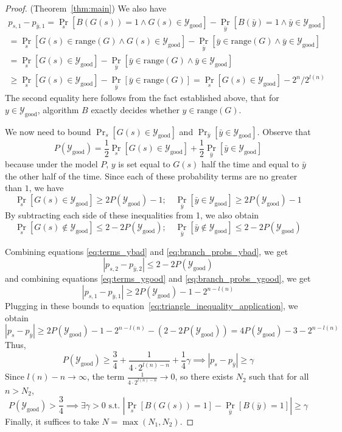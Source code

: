 \documentclass{article}
\def \Ygood{\mathcal{Y}_\text{good}}
\def \by{{\bar{y}}}
\theoremstyle{definition}
\theoremstyle{remark}
\begin{document}
\begin{proof}{(Theorem~\ref{thm:main})}
We also have
\begin{multline} \label{eq:terms_ygood}
p_{s, 1} - p_{\by, 1} =
\Pr_s[B(G(s)) = 1 \wedge G(s) \in \Ygood] - \Pr_\by[B(\by) = 1 \wedge \by \in \Ygood]
 \\
= 
\Pr_s[G(s) \in \text{range}(G) \wedge G(s) \in \Ygood] -
\Pr_\by[\by \in \text{range}(G) \wedge \by \in \Ygood]
\\
= \Pr_s[G(s) \in \Ygood] - \Pr_\by[\by \in \text{range}(G) \wedge \by \in \Ygood] \\
\geq \Pr_s[G(s) \in \Ygood] - \Pr_\by[\by \in \text{range}(G)] 
= \Pr_s[G(s) \in \Ygood] - 2^n/2^{l(n)}
\end{multline}
The second equality here follows from the fact established above, that for $y \in \Ygood$, algorithm $B$ exactly decides whether $y \in \text{range}(G)$.

We now need to bound $\Pr_s[G(s) \in \Ygood]$ and $\Pr_\by[\by \in \Ygood]$.
Observe that
$$
P(\Ygood) = \frac{1}{2}\Pr_s[G(s) \in \Ygood] + \frac{1}{2}\Pr_\by[\by \in \Ygood]
$$
because under the model $P$, $y$ is set equal to $G(s)$ half the time and equal to $\by$ the other half of the time.
Since each of these probability terms are no greater than $1$, we have
\begin{equation} \label{eq:branch_probs_ygood}
\Pr_s[G(s) \in \Ygood] \geq 2P(\Ygood) - 1;
\quad
\Pr_\by[\by \in \Ygood] \geq 2P(\Ygood) - 1        
\end{equation}
By subtracting each side of these inequalities from 1, we also obtain
\begin{equation} \label{eq:branch_probs_ybad}
\Pr_s[G(s) \notin \Ygood] \leq 2 - 2P(\Ygood);
\quad
\Pr_\by[\by \notin \Ygood] \leq 2 - 2P(\Ygood)
\end{equation}

Combining equations \ref{eq:terms_ybad} and \ref{eq:branch_probs_ybad}, we get
\begin{equation}
|p_{s, 2} - p_{\by, 2}| \leq 2 - 2P(\Ygood)    
\end{equation}
and combining equations \ref{eq:terms_ygood} and \ref{eq:branch_probs_ygood}, we get
\begin{equation} \label{eq:term1s_err_bound}
|p_{s, 1} - p_{\by, 1}| \geq 2P(\Ygood) - 1 - 2^{n - l(n)}    
\end{equation}
Plugging in these bounds to equation~\ref{eq:triangle_inequality_application}, we obtain
\begin{equation} \label{eq:final_ps_py_bound}
|p_s - p_\by| \geq
2P(\Ygood) - 1 - 2^{n - l(n)}
- (2 - 2P(\Ygood))
= 4 P(\Ygood) - 3 - 2^{n - l(n)}
\end{equation}
Thus, 
$$
P(\Ygood) \geq \frac{3}{4} + \frac{1}{4 \cdot 2^{l(n) - n}} + \frac{1}{4}\gamma
\implies |p_s - p_\by| \geq \gamma
$$
Since $l(n) - n \to \infty$, the term $\frac{1}{4 \cdot 2^{l(n) - n}} \to 0$,
so there exists $N_2$ such that for all $n > N_2$,
$$
P(\Ygood) > \frac{3}{4} \implies \exists \gamma > 0 \text{ s.t. } |\Pr_s[B(G(s)) = 1] - \Pr_{\bar{y}}[B(\bar{y}) = 1]| \geq \gamma
$$
Finally, it suffices to take $N = \max(N_1, N_2)$.


\end{proof}
\end{document}
